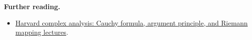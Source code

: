 \documentclass[preprint,12pt,aps,pra,showkeys,amsmath,amssymb,superscriptaddress,floatfix]{revtex4-2}
\theoremstyle{definition}
\theoremstyle{remark}
\providecommand{\tightlist}{\setlength{\itemsep}{2pt}\setlength{\parskip}{0pt}}
\begin{document}
\par\smallskip\begingroup\small\linespread{1.0}\selectfont\noindent\textbf{Further reading.} \begin{itemize}
\tightlist
\item
  \href{https://people.math.harvard.edu/~siu/math113/}{Harvard complex
  analysis: Cauchy formula, argument principle, and Riemann mapping
  lectures}.
\end{itemize}\par\endgroup
\end{document}

